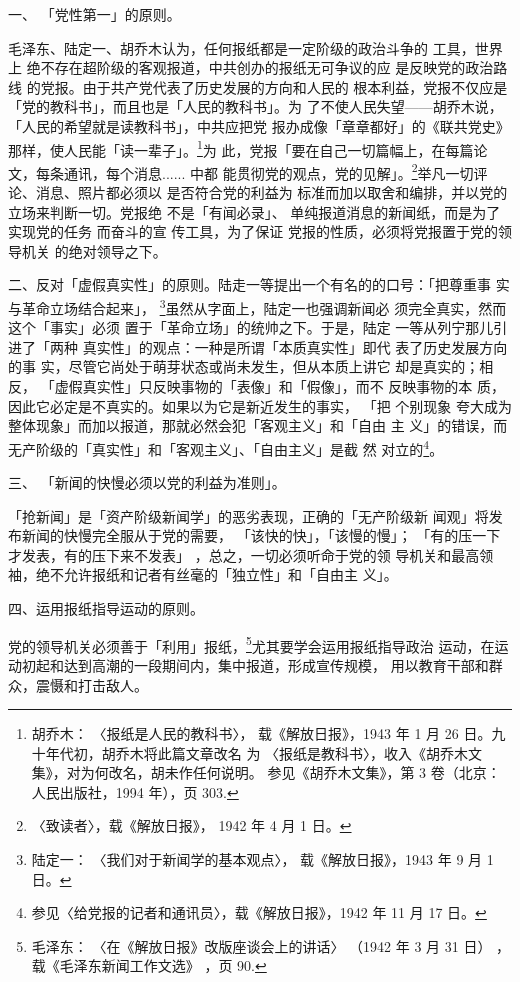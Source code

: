 一、
「党性第一」的原则。

毛泽东、陆定一、胡乔木认为，任何报纸都是一定阶级的政治斗争的 工具，世界上
绝不存在超阶级的客观报道，中共创办的报纸无可争议的应 是反映党的政治路线
的党报。由于共产党代表了历史发展的方向和人民的 根本利益，党报不仅应是
「党的教科书」，而且也是「人民的教科书」。为 了不使人民失望——胡乔木说，
「人民的希望就是读教科书」，中共应把党 报办成像「章章都好」的《联共党史》
那样，使人民能「读一辈子」。\footnote{胡乔木： 〈报纸是人民的教科书〉，
载《解放日报》，1943 年 1 月 26 日。九十年代初，胡乔木将此篇文章改名
为 〈报纸是教科书〉，收入《胡乔木文集》，对为何改名，胡未作任何说明。
参见《胡乔木文集》，第 3 卷（北京：人民出版社，1994 年），页 303.  }为
此，党报「要在自己一切篇幅上，在每篇论文，每条通讯，每个消息......  中都
能贯彻党的观点，党的见解」。\footnote{〈致读者〉，载《解放日报》，
1942 年 4 月 1 日。}举凡一切评论、消息、照片都必须以 是否符合党的利益为
标准而加以取舍和编排，并以党的立场来判断一切。党报绝 不是「有闻必录」、
单纯报道消息的新闻纸，而是为了实现党的任务 而奋斗的宣 传工具，为了保证
党报的性质，必须将党报置于党的领导机关 的绝对领导之下。

二、反对「虚假真实性」的原则。陆走一等提出一个有名的的口号：「把尊重事
实与革命立场结合起来」， \footnote{陆定一： 〈我们对于新闻学的基本观点〉，
载《解放日报》，1943 年 9 月 1 日。}虽然从字面上，陆定一也强调新闻必
须完全真实，然而这个「事实」必须 置于「革命立场」的统帅之下。于是，陆定
一等从列宁那儿引进了「两种 真实性」的观点：一种是所谓「本质真实性」即代
表了历史发展方向的事 实，尽管它尚处于萌芽状态或尚未发生，但从本质上讲它
却是真实的；相 反， 「虚假真实性」只反映事物的「表像」和「假像」，而不
反映事物的本 质，因此它必定是不真实的。如果以为它是新近发生的事实， 「把
个别现象 夸大成为整体现象」而加以报道，那就必然会犯「客观主义」和「自由
主 义」的错误，而无产阶级的「真实性」和「客观主义」、「自由主义」是截 然
对立的\footnote{参见〈给党报的记者和通讯员〉，载《解放日报》，1942 年
11 月 17 日。}。

三、
「新闻的快慢必须以党的利益为准则」。

「抢新闻」是「资产阶级新闻学」的恶劣表现，正确的「无产阶级新
闻观」将发布新闻的快慢完全服从于党的需要，
「该快的快」，「该慢的慢」；
「有的压一下才发表，有的压下来不发表」
，总之，一切必须听命于党的领
导机关和最高领袖，绝不允许报纸和记者有丝毫的「独立性」和「自由主
义」。

四、运用报纸指导运动的原则。

党的领导机关必须善于「利用」报纸，\footnote{毛泽东：
〈在《解放日报》改版座谈会上的讲话〉
（1942 年 3 月 31 日）
，载《毛泽东新闻工作文选》
，页 90.}尤其要学会运用报纸指导政治
运动，在运动初起和达到高潮的一段期间内，集中报道，形成宣传规模，
用以教育干部和群众，震慑和打击敌人。

